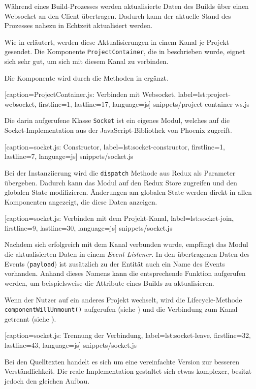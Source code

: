 Während eines Build-Prozesses werden aktualisierte Daten des Builds über einen Websocket an den Client übertragen. Dadurch kann der aktuelle Stand des Prozesses nahezu in Echtzeit aktualisiert werden.

Wie in  erläutert, werden diese Aktualisierungen in einem Kanal je Projekt gesendet. Die Komponente \texttt{Project\-Con\-tain\-er}, die in  beschrieben wurde, eignet sich sehr gut, um sich mit diesem Kanal zu verbinden.

Die Komponente wird durch die Methoden in  ergänzt.


  [caption={ProjectContainer.js: Verbinden mit Websocket},
  label={lst:project-websocket},
  firstline=1,
  lastline=17,
  language=js]
  {snippets/project-container-ws.js}

Die darin aufgerufene Klasse \texttt{Socket} ist ein eigenes Modul, welches auf die Socket-Implementation aus der JavaScript-Bibliothek von Phoenix zugreift.


  [caption={socket.js: Constructor},
  label={lst:socket-constructor},
  firstline=1,
  lastline=7,
  language=js]
  {snippets/socket.js}

Bei der Instanziierung wird die \texttt{dispatch} Methode aus Redux als Pa\-ra\-me\-ter über\-ge\-ben. Dadurch kann das Modul auf den Redux Store zugreifen und den globalen State modifizieren. Änderungen am globalen State werden direkt in allen Komponenten angezeigt, die diese Daten anzeigen.


  [caption={socket.js: Verbinden mit dem Projekt-Kanal},
  label={lst:socket-join},
  firstline=9,
  lastline=30,
  language=js]
  {snippets/socket.js}

Nachdem sich erfolgreich mit dem Kanal verbunden wurde, empfängt das Modul die aktualisierten Daten in einem \emph{Event Listener}. In den übertragenen Daten des Events (\texttt{payload}) ist zusätzlich zu der Entität auch ein Name des Events vorhanden. Anhand dieses Namens kann die entsprechende Funktion aufgerufen werden, um beispielsweise die Attribute eines Builds zu aktualisieren.

Wenn der Nutzer auf ein anderes Projekt wechselt, wird die Lifecycle-Methode \texttt{componentWillUnmount()} aufgerufen (siehe ) und die Verbindung zum Kanal getrennt (siehe ).


  [caption={socket.js: Trennung der Verbindung},
  label={lst:socket-leave},
  firstline=32,
  lastline=43,
  language=js]
  {snippets/socket.js}

Bei den Quelltexten handelt es sich um eine vereinfachte Version zur besseren Ver\-ständ\-lich\-keit. Die reale Implementation gestaltet sich etwas komplexer, besitzt jedoch den gleichen Aufbau.
